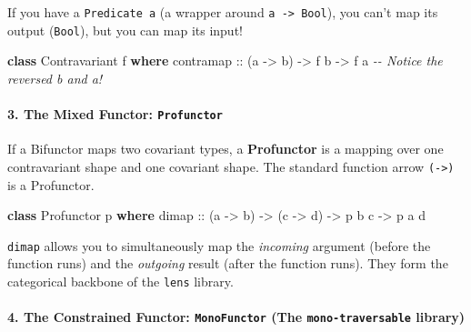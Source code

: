 \documentclass[
]{article}
\newenvironment{Shaded}{}{}
\newcommand{\CommentTok}[1]{\textcolor[rgb]{0.38,0.63,0.69}{\textit{#1}}}
\newcommand{\DataTypeTok}[1]{\textcolor[rgb]{0.56,0.13,0.00}{#1}}
\newcommand{\KeywordTok}[1]{\textcolor[rgb]{0.00,0.44,0.13}{\textbf{#1}}}
\newcommand{\NormalTok}[1]{#1}
\newcommand{\OtherTok}[1]{\textcolor[rgb]{0.00,0.44,0.13}{#1}}
\begin{document}
If you have a \texttt{Predicate\ a} (a wrapper around
\texttt{a\ -\textgreater{}\ Bool}), you can't map its output
(\texttt{Bool}), but you can map its input!

\begin{Shaded}
\begin{Highlighting}[]
\KeywordTok{class} \DataTypeTok{Contravariant}\NormalTok{ f }\KeywordTok{where}
\OtherTok{    contramap ::}\NormalTok{ (a }\OtherTok{{-}\textgreater{}}\NormalTok{ b) }\OtherTok{{-}\textgreater{}}\NormalTok{ f b }\OtherTok{{-}\textgreater{}}\NormalTok{ f a  }\CommentTok{{-}{-} Notice the reversed \textquotesingle{}b\textquotesingle{} and \textquotesingle{}a\textquotesingle{}!}
\end{Highlighting}
\end{Shaded}

\paragraph{\texorpdfstring{3. The Mixed Functor:
\texttt{Profunctor}}{3. The Mixed Functor: Profunctor}}\label{the-mixed-functor-profunctor}

If a Bifunctor maps two covariant types, a \textbf{Profunctor} is a
mapping over one contravariant shape and one covariant shape. The
standard function arrow \texttt{(-\textgreater{})} is a Profunctor.

\begin{Shaded}
\begin{Highlighting}[]
\KeywordTok{class} \DataTypeTok{Profunctor}\NormalTok{ p }\KeywordTok{where}
\OtherTok{    dimap ::}\NormalTok{ (a }\OtherTok{{-}\textgreater{}}\NormalTok{ b) }\OtherTok{{-}\textgreater{}}\NormalTok{ (c }\OtherTok{{-}\textgreater{}}\NormalTok{ d) }\OtherTok{{-}\textgreater{}}\NormalTok{ p b c }\OtherTok{{-}\textgreater{}}\NormalTok{ p a d}
\end{Highlighting}
\end{Shaded}

\texttt{dimap} allows you to simultaneously map the \emph{incoming}
argument (before the function runs) and the \emph{outgoing} result
(after the function runs). They form the categorical backbone of the
\texttt{lens} library.

\paragraph{\texorpdfstring{4. The Constrained Functor:
\texttt{MonoFunctor} (The \texttt{mono-traversable}
library)}{4. The Constrained Functor: MonoFunctor (The mono-traversable library)}}\label{the-constrained-functor-monofunctor-the-mono-traversable-library}
\end{document}
